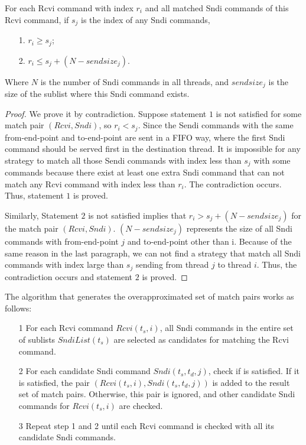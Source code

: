 \begin{lemma}
For each Rcvi command with index $r_i$ and all matched Sndi commands of this Rcvi command, if $s_j$ is the index of any Sndi commands,
\begin{itemize}
\item[1.] $r_i \geq s_j$;
\item[2.] $r_i \leq s_j + (N - sendsize_j)$.
\end{itemize}
Where $N$ is the number of Sndi commands in all threads, and $sendsize_j$ is the size of the sublist where this Sndi command exists.
\label{lemma:Rcvi_Sndi_index}
\end{lemma}
\begin{proof}
We prove it by contradiction. Suppose statement $1$ is not satisfied for some match pair $(Rcvi, Sndi)$, so $r_i < s_j$. Since the Sendi commands with the same from-end-point and to-end-point are sent in a FIFO way, where the first Sndi command should be served first in the destination thread. It is impossible for any strategy to match all those Sendi commands with index less than $s_j$ with some commands because there exist at least one extra Sndi command that can not match any Rcvi command with index less than $r_i$. The contradiction occurs. Thus, statement $1$ is proved.

Similarly, Statement $2$ is not satisfied implies that $r_i > s_j + (N - sendsize_j)$ for the match pair $(Rcvi, Sndi)$. $(N - sendsize_j)$ represents the size of all Sndi commands with from-end-point $j$ and to-end-point other than i. Because of the same reason in the last paragraph, we can not find a strategy that match all Sndi commands with index large than $s_j$ sending from thread $j$ to thread $i$. Thus, the contradiction occurs and statement $2$ is proved.

\end{proof}

The algorithm that generates the overapproximated set of match pairs works as follows:
\begin{itemize}
\item[1] For each Rcvi command $Rcvi(t_s, i)$, all Sndi commands in the entire set of sublists $SndiList(t_s)$ are selected as candidates for matching the Rcvi command.
\item[2] For each candidate Sndi command $Sndi(t_s, t_d, j)$, check if  is satisfied. If it is satisfied, the pair $(Rcvi(t_s, i), Sndi(t_s, t_d, j))$ is added to the result set of match pairs. Otherwise, this pair is ignored, and other candidate Sndi commands for $Rcvi(t_s, i)$ are checked.
\item[3] Repeat step 1 and 2 until each Rcvi command is checked with all its candidate Sndi commands.
\end{itemize}

